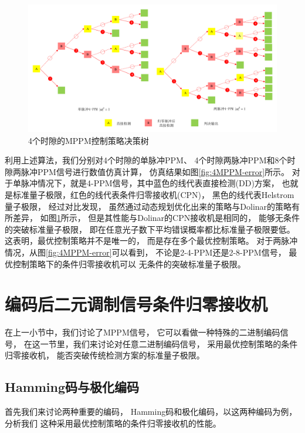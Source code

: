 \begin{figure}
\centering
  \includegraphics[width=\textwidth]{figures/chap4/2-4-PPM-DT}
  \caption{4个时隙的MPPM控制策略决策树}
  \label{fig:4MPPM-DT}
\end{figure}

利用上述算法，我们分别对4个时隙的单脉冲PPM、
4个时隙两脉冲PPM和8个时隙两脉冲PPM信号进行数值仿真计算，
仿真结果如图\ref{fig:4MPPM-error}所示。
对于单脉冲情况下，就是4-PPM信号，其中蓝色的线代表直接检测(DD)方案，
也就是标准量子极限，红色的线代表条件归零接收机(CPN)，
黑色的线代表Helstrom量子极限，
经过对比发现，
虽然通过动态规划优化出来的策略与Dolinar的策略有所差异，
如图\ref{fig:4MPPM-DT}所示，
但是其性能与Dolinar的CPN接收机是相同的，
能够无条件的突破标准量子极限，
即在任意光子数下平均错误概率都比标准量子极限要低。
这表明，最优控制策略并不是唯一的，
而是存在多个最优控制策略。
对于两脉冲情况，从图\ref{fig:4MPPM-error}可以看到，
不论是2-4-PPM还是2-8-PPM信号，
最优控制策略下的条件归零接收机可以
无条件的突破标准量子极限。





\section{编码后二元调制信号条件归零接收机}
在上一小节中，我们讨论了MPPM信号，
它可以看做一种特殊的二进制编码信号，
在这一节里，我们来讨论对任意二进制编码信号，
采用最优控制策略的条件归零接收机，
能否突破传统检测方案的标准量子极限。

\subsection{Hamming码与极化编码}
首先我们来讨论两种重要的编码，
Hamming码和极化编码，以这两种编码为例，分析我们
这种采用最优控制策略的条件归零接收机的性能。

